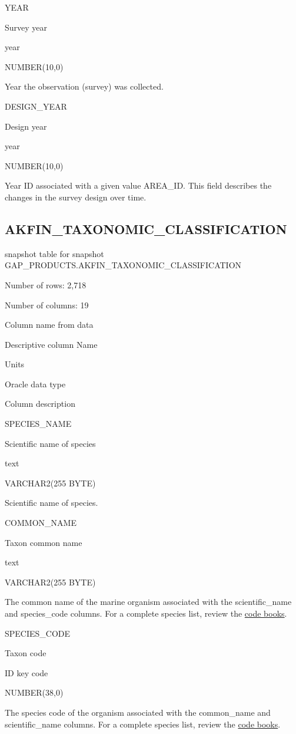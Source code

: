 \documentclass[
  letterpaper,
  oneside,
  open=any]{scrbook}
\begin{document}
YEAR

Survey year

year

NUMBER(10,0)

Year the observation (survey) was collected.

DESIGN\_YEAR

Design year

year

NUMBER(10,0)

Year ID associated with a given value AREA\_ID. This field describes the
changes in the survey design over time.

\subsection{AKFIN\_TAXONOMIC\_CLASSIFICATION}\label{akfin_taxonomic_classification}

snapshot table for snapshot
GAP\_PRODUCTS.AKFIN\_TAXONOMIC\_CLASSIFICATION

Number of rows: 2,718

Number of columns: 19

Column name from data

Descriptive column Name

Units

Oracle data type

Column description

SPECIES\_NAME

Scientific name of species

text

VARCHAR2(255 BYTE)

Scientific name of species.

COMMON\_NAME

Taxon common name

text

VARCHAR2(255 BYTE)

The common name of the marine organism associated with the
scientific\_name and species\_code columns. For a complete species list,
review the
\href{https://www.fisheries.noaa.gov/resource/document/groundfish-survey-species-code-manual-and-data-codes-manual}{code
books}.

SPECIES\_CODE

Taxon code

ID key code

NUMBER(38,0)

The species code of the organism associated with the common\_name and
scientific\_name columns. For a complete species list, review the
\href{https://www.fisheries.noaa.gov/resource/document/groundfish-survey-species-code-manual-and-data-codes-manual}{code
books}.
\end{document}
